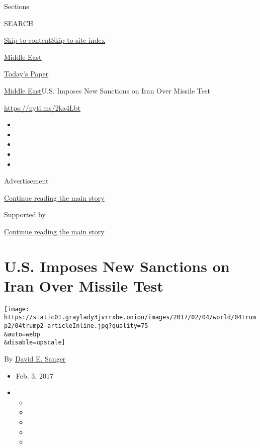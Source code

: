 Sections

SEARCH

\protect\hyperlink{site-content}{Skip to
content}\protect\hyperlink{site-index}{Skip to site index}

\href{https://www.nytimes3xbfgragh.onion/section/world/middleeast}{Middle
East}

\href{https://myaccount.nytimes3xbfgragh.onion/auth/login?response_type=cookie\&client_id=vi}{}

\href{https://www.nytimes3xbfgragh.onion/section/todayspaper}{Today's
Paper}

\href{/section/world/middleeast}{Middle East}\textbar{}U.S. Imposes New
Sanctions on Iran Over Missile Test

\url{https://nyti.ms/2ka4Lbt}

\begin{itemize}
\item
\item
\item
\item
\item
\end{itemize}

Advertisement

\protect\hyperlink{after-top}{Continue reading the main story}

Supported by

\protect\hyperlink{after-sponsor}{Continue reading the main story}

\hypertarget{us-imposes-new-sanctions-on-iran-over-missile-test}{%
\section{U.S. Imposes New Sanctions on Iran Over Missile
Test}\label{us-imposes-new-sanctions-on-iran-over-missile-test}}

\texttt{[image: https://static01.graylady3jvrrxbe.onion/images/2017/02/04/world/04trump2/04trump2-articleInline.jpg?quality=75\\\&auto=webp\\\&disable=upscale]}

By \href{http://www.nytimes3xbfgragh.onion/by/david-e-sanger}{David E.
Sanger}

\begin{itemize}
\item
  Feb. 3, 2017
\item
  \begin{itemize}
  \item
  \item
  \item
  \item
  \item
  \end{itemize}
\end{itemize}

